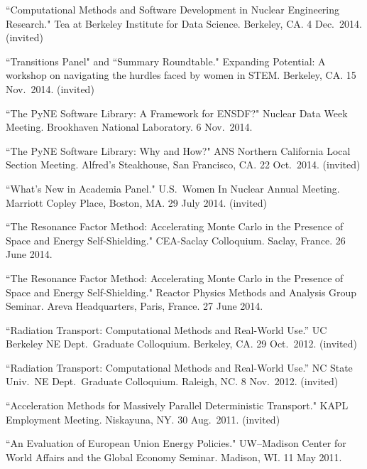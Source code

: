 \begin{bibsection}
\item ``Computational Methods and Software Development in Nuclear Engineering Research." Tea at Berkeley Institute for Data Science. Berkeley, CA. 4 Dec.\ 2014. (invited)

\item ``Transitions Panel" and ``Summary Roundtable." Expanding Potential: A workshop on navigating the hurdles faced by women in STEM. Berkeley, CA. 15 Nov.\ 2014. (invited)

\item ``The PyNE Software Library: A Framework for ENSDF?" Nuclear Data Week Meeting. Brookhaven National Laboratory. 6 Nov.\ 2014. 

\item ``The PyNE Software Library: Why and How?" ANS Northern California Local Section Meeting. Alfred's Steakhouse, San Francisco, CA. 22 Oct.\ 2014. (invited)

\item ``What's New in Academia Panel." U.S.\ Women In Nuclear Annual Meeting. Marriott Copley Place, Boston, MA. 29 July 2014. (invited)

\item ``The Resonance Factor Method: Accelerating Monte Carlo in the Presence of Space and Energy Self-Shielding." CEA-Saclay Colloquium. Saclay, France. 26 June 2014.

\item ``The Resonance Factor Method: Accelerating Monte Carlo in the Presence of Space and Energy Self-Shielding." Reactor Physics Methods and Analysis Group Seminar. Areva Headquarters, Paris, France. 27 June 2014.

\item ``Radiation Transport: Computational Methods and Real-World Use.'' UC Berkeley NE Dept.\ Graduate Colloquium. Berkeley, CA. 29 Oct.\ 2012. (invited)

\item ``Radiation Transport: Computational Methods and Real-World Use.'' NC State Univ.\ NE Dept.\ Graduate Colloquium. Raleigh, NC. 8 Nov.\ 2012. (invited)

\item ``Acceleration Methods for Massively Parallel Deterministic Transport." KAPL Employment Meeting. Niskayuna, NY. 30 Aug.\ 2011. (invited)

\item ``An Evaluation of European Union Energy Policies." UW--Madison Center for World Affairs and the Global Economy Seminar. Madison, WI. 11 May 2011.


\end{bibsection}
